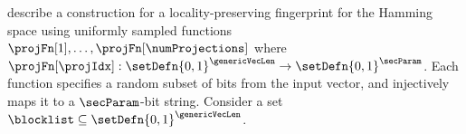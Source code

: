 %
\citet{chongchitmate2024approximate} describe a construction for a locality-preserving fingerprint for the Hamming space using uniformly sampled functions $\projFn[1], \dots, 
\projFn[\numProjections]$ where $\projFn[\projIdx]: \setDefn{0,1}^{\genericVecLen} \rightarrow 
\setDefn{0,1}^{\secParam}$. Each function specifies a random subset of bits from the input 
vector, and injectively maps it to a $\secParam$-bit string. Consider a set
$\blocklist \subseteq \setDefn{0,1}^{\genericVecLen}$.

